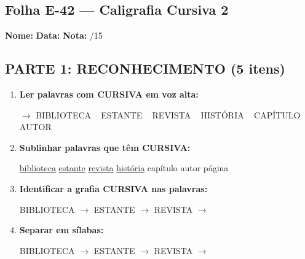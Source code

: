 \subsection{Folha E-42 --- Caligrafia Cursiva 2}
\begin{exercicio}



\noindent\textbf{Nome:} \underline{\hspace{3.2cm}} \quad \textbf{Data:} \underline{\hspace{1.6cm}} \quad \textbf{Nota:} \underline{\hspace{0.9cm}}/15


\subsection*{PARTE 1: RECONHECIMENTO (5 itens)}

\begin{enumerate}

  \item \textbf{Ler palavras com CURSIVA em voz alta:}
  \begin{center}
  $\rightarrow$ BIBLIOTECA ~ ESTANTE ~ REVISTA ~ HISTÓRIA ~ CAPÍTULO ~ AUTOR
  \end{center}

  \item \textbf{Sublinhar palavras que têm CURSIVA:}

\begin{center}
  \uline{biblioteca} \quad \uline{estante} \quad \uline{revista} \quad \uline{história} \quad capítulo \quad autor \quad página
\end{center}

  \item \textbf{Identificar a grafia CURSIVA nas palavras:}
  \begin{center}
  BIBLIOTECA $\rightarrow$ \underline{\hspace{1cm}} \quad ESTANTE $\rightarrow$ \underline{\hspace{1cm}} \quad REVISTA $\rightarrow$ \underline{\hspace{1cm}}
  \end{center}

  \item \textbf{Separar em sílabas:}
  \begin{center}
  BIBLIOTECA $\rightarrow$ \underline{\hspace{1.2cm}} \quad ESTANTE $\rightarrow$ \underline{\hspace{1.2cm}} \quad REVISTA $\rightarrow$ \underline{\hspace{1.2cm}}
  \end{center}


\end{enumerate}
\end{exercicio}
